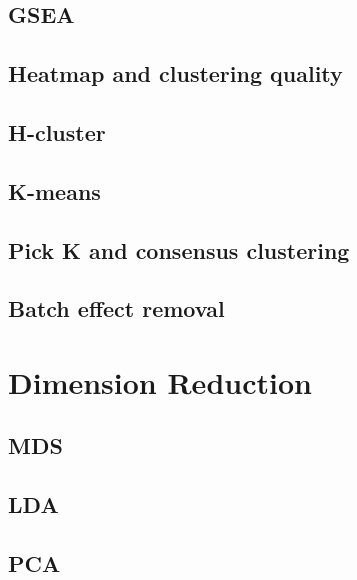 \documentclass[]{book}
\begin{document}
\hypertarget{gsea-1}{%
\section{GSEA}\label{gsea-1}}

\hypertarget{heatmap-and-clustering-quality}{%
\section{Heatmap and clustering quality}\label{heatmap-and-clustering-quality}}

\hypertarget{h-cluster}{%
\section{H-cluster}\label{h-cluster}}

\hypertarget{k-means}{%
\section{K-means}\label{k-means}}

\hypertarget{pick-k-and-consensus-clustering}{%
\section{Pick K and consensus clustering}\label{pick-k-and-consensus-clustering}}

\hypertarget{batch-effect-removal}{%
\section{Batch effect removal}\label{batch-effect-removal}}

\hypertarget{dr}{%
\chapter{Dimension Reduction}\label{dr}}

\hypertarget{mds}{%
\section{MDS}\label{mds}}

\hypertarget{lda}{%
\section{LDA}\label{lda}}

\hypertarget{pca}{%
\section{PCA}\label{pca}}
\end{document}
